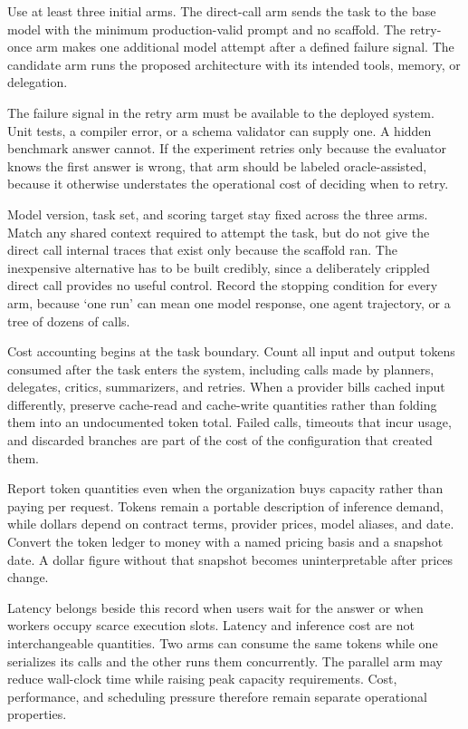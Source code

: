 Use at least three initial arms. The direct-call arm sends the task to the base model with the minimum production-valid prompt and no scaffold. The retry-once arm makes one additional model attempt after a defined failure signal. The candidate arm runs the proposed architecture with its intended tools, memory, or delegation.

The failure signal in the retry arm must be available to the deployed system. Unit tests, a compiler error, or a schema validator can supply one. A hidden benchmark answer cannot. If the experiment retries only because the evaluator knows the first answer is wrong, that arm should be labeled oracle-assisted, because it otherwise understates the operational cost of deciding when to retry.

Model version, task set, and scoring target stay fixed across the three arms. Match any shared context required to attempt the task, but do not give the direct call internal traces that exist only because the scaffold ran. The inexpensive alternative has to be built credibly, since a deliberately crippled direct call provides no useful control. Record the stopping condition for every arm, because `one run' can mean one model response, one agent trajectory, or a tree of dozens of calls.

Cost accounting begins at the task boundary. Count all input and output tokens consumed after the task enters the system, including calls made by planners, delegates, critics, summarizers, and retries. When a provider bills cached input differently, preserve cache-read and cache-write quantities rather than folding them into an undocumented token total. Failed calls, timeouts that incur usage, and discarded branches are part of the cost of the configuration that created them.

Report token quantities even when the organization buys capacity rather than paying per request. Tokens remain a portable description of inference demand, while dollars depend on contract terms, provider prices, model aliases, and date. Convert the token ledger to money with a named pricing basis and a snapshot date. A dollar figure without that snapshot becomes uninterpretable after prices change.

Latency belongs beside this record when users wait for the answer or when workers occupy scarce execution slots. Latency and inference cost are not interchangeable quantities. Two arms can consume the same tokens while one serializes its calls and the other runs them concurrently. The parallel arm may reduce wall-clock time while raising peak capacity requirements. Cost, performance, and scheduling pressure therefore remain separate operational properties.

